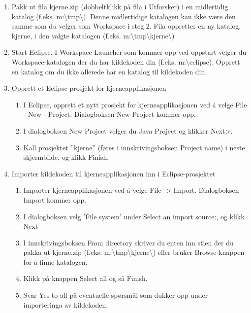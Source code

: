 \documentclass[a4paper]{scrartcl}
\begin{document}
\begin{enumerate}

\item
Pakk ut fila kjerne.zip (dobbeltklikk på fila i Utforsker) i en midlertidig katalog (f.eks. m:\textbackslash tmp\textbackslash ).  Denne midlertidige katalogen kan ikke være den samme som du velger som Workspace i steg 2. Fila oppretter en ny katalog, kjerne, i den valgte katalogen (f.eks. m:\textbackslash tmp\textbackslash kjerne\textbackslash )

\item
Start Eclipse. I Workspace Launcher som kommer opp ved oppstart velger du Workspace-katalogen der du har kildekoden din (f.eks. m:\textbackslash eclipse).  Opprett en katalog om du ikke allerede har en katalog til kildekoden din.

\item
Opprett et Eclipse-prosjekt for kjerneapplikasjonen
\begin{enumerate}

\item
I Eclipse, opprett et nytt prosjekt for kjerneapplikasjonen ved å velge File - New - Project.  Dialogboksen New Project kommer opp.

\item
I dialogboksen New Project velger du Java Project og klikker Next>.

\item
Kall prosjektet ”kjerne” (føres i innskrivingsboksen Project name) i neste skjermbilde, og klikk Finish.

\end{enumerate}

\item
Importer kildekoden til kjerneapplikasjonen inn i Eclipse-prosjektet

\begin{enumerate}

\item
Importer kjerneapplikasjonen ved å velge File -> Import.  Dialogboksen Import kommer opp.

\item
I dialogboksen velg 'File system' under Select an import source:, og klikk Next

\item
I innskrivingsboksen From directory skriver du enten inn stien der du pakka ut kjerne.zip (f.eks. m:\textbackslash tmp\textbackslash kjerne\textbackslash ) eller bruker Browse-knappen for å finne katalogen.

\item
Klikk på knappen Select all og så Finish.

\item
Svar Yes to all på eventuelle spørsmål som dukker opp under importeringa av kildekoden.

\end{enumerate}

\end{enumerate}
\end{document}
